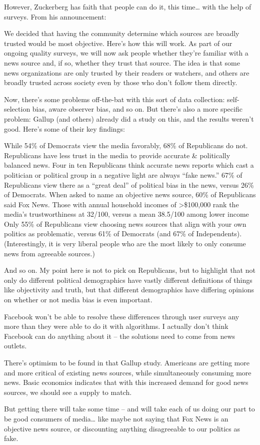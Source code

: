 \documentclass[11pt]{article}
\begin{document}
\begin{itemize}
However, Zuckerberg has faith that people can do it, this time… with the help of surveys. From his announcement:

We decided that having the community determine which sources are broadly trusted would be most objective. Here’s how this will work. As part of our ongoing quality surveys, we will now ask people whether they’re familiar with a news source and, if so, whether they trust that source. The idea is that some news organizations are only trusted by their readers or watchers, and others are broadly trusted across society even by those who don’t follow them directly.

Now, there’s some problems off-the-bat with this sort of data collection: self-selection bias, aware observer bias, and so on. But there’s also a more specific problem: Gallup (and others) already did a study on this, and the results weren’t good. Here’s some of their key findings:

While 54\% of Democrats view the media favorably, 68\% of Republicans do not.
Republicans have less trust in the media to provide accurate \& politically balanced news.
Four in ten Republicans think accurate news reports which cast a politician or political group in a negative light are always “fake news.”
67\% of Republicans view there as a “great deal” of political bias in the news, versus 26\% of Democrats.
When asked to name an objective news source, 60\% of Republicans said Fox News.
Those with annual household incomes of >\$100,000 rank the media’s trustworthiness at 32/100, versus a mean 38.5/100 among lower income
Only 55\% of Republicans view choosing news sources that align with your own politics as problematic, versus 61\% of Democrats (and 67\% of Independents). (Interestingly, it is very liberal people who are the most likely to only consume news from agreeable sources.)

And so on. My point here is not to pick on Republicans, but to highlight that not only do different political demographics have vastly different definitions of things like objectivity and truth, but that different demographics have differing opinions on whether or not media bias is even important.

Facebook won’t be able to resolve these differences through user surveys any more than they were able to do it with algorithms. I actually don’t think Facebook can do anything about it – the solutions need to come from news outlets.

There’s optimism to be found in that Gallup study. Americans are getting more and more critical of existing news sources, while simultaneously consuming more news. Basic economics indicates that with this increased demand for good news sources, we should see a supply to match.

But getting there will take some time – and will take each of us doing our part to be good consumers of media… like maybe not saying that Fox News is an objective news source, or discounting anything disagreeable to our politics as fake.
\end{itemize}
\stopcontents[level-4]
\end{document}
